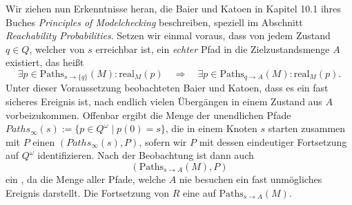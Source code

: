\documentclass[a4paper]{article}
\theoremstyle{nonumberplain}
\begin{document}
Wir ziehen nun Erkenntnisse heran, die Baier und Katoen in Kapitel 10.1 ihres Buches \textit{Principles of Modelchecking} \cite{Bai08} beschreiben, speziell im Abschnitt \textit{Reachability Probabilities}.
Setzen wir einmal voraus, dass von jedem Zustand $q\in Q$, welcher von $s$ erreichbar ist, ein \textit{echter} Pfad in die Zielzustandsmenge $A$ existiert, das heißt
\[
\exists p \in \mathrm{Paths}_{s \rightarrow \{q\}}(M) : \mathrm{real}_M(p) \quad \Rightarrow \quad \exists p \in \mathrm{Paths}_{q \rightarrow A}(M) : \mathrm{real}_M(p)\text{.}
\]
 Unter dieser Voraussetzung beobachteten Baier und Katoen, dass es ein fast sicheres Ereignis ist, nach endlich vielen Übergängen in einem Zustand aus $A$ vorbeizukommen.
Offenbar ergibt die Menge der unendlichen Pfade $Paths_{\infty}(s) := \{p \in Q^\omega \mid p(0) = s\}$, die in einem Knoten $s$ starten zusammen mit $P$ einen \probspace{} $(Paths_{\infty}(s), P)$, sofern wir $P$ mit dessen eindeutiger Fortsetzung auf $Q^\omega$ identifizieren.
Nach der Beobachtung ist dann auch
\[
(\mathrm{Paths}_{s \rightarrow A}(M), P)
\] ein \probspace{}, da die Menge aller Pfade, welche $A$ nie besuchen ein fast unmögliches Ereignis darstellt. Die Fortsetzung von $R$ eine \rvar{} auf $\mathrm{Paths}_{s \rightarrow A}(M)$. 
\end{document}
